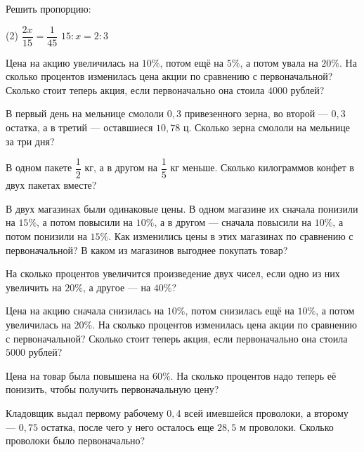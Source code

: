 \begin{homework}[number=2]
	\begin{listofex}
		\item Решить пропорцию:
		\begin{tasks}(2)
			\task \( \dfrac{2x}{15}=\dfrac{1}{45} \)
			\task \( 15:x=2:3\)
		\end{tasks}
		\item Цена на акцию увеличилась на \(10\%\), потом ещё на \(5\%\), а потом увала на \(20\%\). На сколько процентов изменилась цена акции по сравнению с первоначальной? Сколько стоит теперь акция, если первоначально она стоила \(4000\) рублей?
		\item В первый день на мельнице смололи \(0,3\) привезенного зерна, во второй --- \(0,3\) остатка, а в третий --- оставшиеся \(10,78\) ц. Сколько зерна смололи на мельнице за три дня?
		\item В одном пакете \( \dfrac{1}{2} \) кг, а в другом на \(\dfrac{1}{5}\) кг меньше.
		Сколько килограммов конфет в двух пакетах вместе?
	\end{listofex}
\end{homework}

\begin{homework}[number=3]
	\begin{listofex}
		\item В двух магазинах были одинаковые цены. В одном магазине их сначала понизили на \(15\%\), а потом повысили на \(10\%\), а в другом --- сначала повысили на \(10\%\), а потом понизили на \(15\%\). Как изменились цены в этих магазинах по сравнению с первоначальной? В каком из магазинов выгоднее покупать товар?
		\item На сколько процентов увеличится произведение двух чисел, если одно из них увеличить на \(20\%\), а другое --- на \( 40\% \)?
	\end{listofex}
\end{homework}

\begin{exam}
	\begin{listofex}
		\item Цена на акцию сначала снизилась на \(10\%\), потом снизилась ещё на \(10\%\), а потом увеличилась на \(20\%\). На сколько процентов изменилась цена акции по сравнению с первоначальной? Сколько стоит теперь акция, если первоначально она стоила \(5000\) рублей?
		\item Цена на товар была повышена на \( 60\% \). На сколько процентов надо теперь её понизить, чтобы получить первоначальную цену?
		\item Кладовщик выдал первому рабочему \(0,4\) всей имевшейся проволоки, а второму --- \(0,75\) остатка, после чего у него осталось еще \(28,5\) м проволоки. Сколько проволоки было первоначально?
	\end{listofex}
\end{exam}
